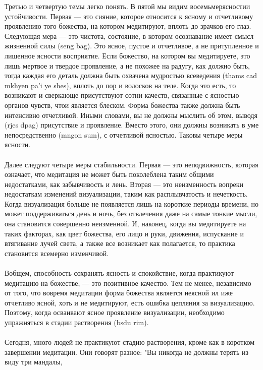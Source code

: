 \begin{siderules}
Третью и четвертую темы легко понять. В пятой мы видим восемьмерясностии
устойчивости. Первая — это сияние, которое относится к ясному и отчетливому проявлению
того божества, на котором медитируют, вплоть до зрачков его глаз. Следующая мера — это
чистота, состояние, в котором осознавание имеет смысл жизненной силы (seng bag). Это
ясное, пустое и отчетливое, а не притупленное и лишенное ясности восприятие. Если
божество, на котором вы медитируете, это лишь мертвое и твердое проявление, а не похожее
на радугу, как должно быть, тогда каждая его деталь должна быть охвачена мудростью
всеведения (thams cad mkhyen pa'i ye shes), вплоть до пор и волосков на теле. Когда это есть,
то возникают и сверкающе присутствуют сотни качеств, связанные с ясностью органов
чувств, чтои является блеском. Форма божества также должна быть интенсивно отчетливой.
Иными словами, вы не должны мыслить об этом, выводя (rjes dpag) присутствие и
проявление. Вместо этого, они должны возникать в уме непосредственно (mngon sum), с
отчетливой ясностью. Таковы четыре меры ясности.\\
\\
Далее следуют четыре меры стабильности. Первая — это неподвижность, которая означает,
что медитация не может быть поколеблена таким общими недостатками, как забывчивость и
лень. Вторая — это неизменность вопреки недостаткам изменений визуализации, таким как
расплывчатость и нечеткость. Когда визуализация больше не появляется лишь на короткие
периоды времени, но может поддерживаться день и ночь, без отвлечения даже на самые
тонкие мысли, она становится совершенно неизменной. И, наконец, когда вы медитируете на
таких факторах, как цвет божества, его лицо и руки, движения, испускание и втягивание
лучей света, а также все возникает как полагается, то практика становится всемерно
изменчивой.\\
\\
Вобщем, способность сохранять ясность и спокойствие, когда практикуют медитацию на
божестве, — это позитивное качество. Тем не менее, независимо от того, что вовремя
медитации форма божества является неясной ил иже отчетливо ясной, хоть и не медитируют,
есть ошибка цепляния за визуализацию. Поэтому, когда осваивают ясное проявление
визуализации, необходимо упражняться в стадии растворения (bsdu rim).\\
\\
Сегодня, много людей не практикуют стадию растворения, кроме как в коротком завершении
медитации. Они говорят разное: "Вы никогда не должны терять из виду три мандалы,

\end{siderules}
